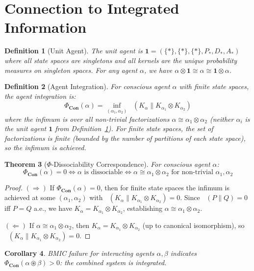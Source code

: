 \documentclass[11pt,a4paper]{article}
\newtheorem{theorem}{Theorem}[section]
\newtheorem{corollary}[theorem]{Corollary}
\newtheorem{definition}[theorem]{Definition}
\newcommand{\Con}{\mathbf{Con}}
\DeclareMathOperator{\DKL}{D_{KL}}
\begin{document}
\section{Connection to Integrated Information}\label{sec:iit}

\begin{definition}[Unit Agent]\label{def:unit-agent}
The \emph{unit agent} is $\mathbf{1} = (\{*\}, \{*\}, \{*\}, P_*, D_*, A_*)$ where all state spaces are singletons and all kernels are the unique probability measures on singleton spaces. For any agent $\alpha$, we have $\alpha \otimes \mathbf{1} \cong \alpha \cong \mathbf{1} \otimes \alpha$.
\end{definition}

\begin{definition}[Agent Integration]\label{def:phi}
For conscious agent $\alpha$ with finite state spaces, the \emph{agent integration} is:
\[
\Phi_{\Con}(\alpha) = \inf_{(\alpha_1, \alpha_2)} \DKL(K_\alpha \| K_{\alpha_1} \otimes K_{\alpha_2})
\]
where the infimum is over all non-trivial factorizations $\alpha \cong \alpha_1 \otimes \alpha_2$ (neither $\alpha_i$ is the unit agent $\mathbf{1}$ from Definition~\ref{def:unit-agent}). For finite state spaces, the set of factorizations is finite (bounded by the number of partitions of each state space), so the infimum is achieved.
\end{definition}

\begin{theorem}[$\Phi$-Dissociability Correspondence]\label{thm:phi}
For conscious agent $\alpha$:
\[
\Phi_{\Con}(\alpha) = 0 \iff \alpha \text{ is dissociable} \iff \alpha \cong \alpha_1 \otimes \alpha_2 \text{ for non-trivial } \alpha_1, \alpha_2
\]
\end{theorem}

\begin{proof}
$(\Rightarrow)$ If $\Phi_{\Con}(\alpha) = 0$, then for finite state spaces the infimum is achieved at some $(\alpha_1, \alpha_2)$ with $\DKL(K_\alpha \| K_{\alpha_1} \otimes K_{\alpha_2}) = 0$. Since $\DKL(P \| Q) = 0$ iff $P = Q$ a.e., we have $K_\alpha = K_{\alpha_1} \otimes K_{\alpha_2}$, establishing $\alpha \cong \alpha_1 \otimes \alpha_2$.

$(\Leftarrow)$ If $\alpha \cong \alpha_1 \otimes \alpha_2$, then $K_\alpha = K_{\alpha_1} \otimes K_{\alpha_2}$ (up to canonical isomorphism), so $\DKL(K_\alpha \| K_{\alpha_1} \otimes K_{\alpha_2}) = 0$.
\end{proof}

\begin{corollary}\label{cor:bmic-phi}
BMIC failure for interacting agents $\alpha, \beta$ indicates $\Phi_{\Con}(\alpha \circledast \beta) > 0$: the combined system is integrated.
\end{corollary}
\end{document}
